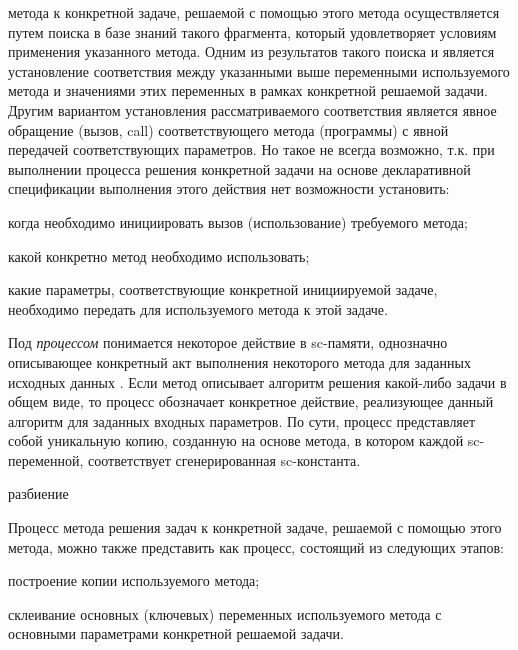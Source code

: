  метода к конкретной задаче, решаемой с помощью этого метода осуществляется путем поиска в базе знаний такого фрагмента, который удовлетворяет условиям применения указанного метода. Одним из результатов такого поиска и является установление соответствия между указанными выше переменными используемого метода и значениями этих переменных в рамках конкретной решаемой задачи. Другим вариантом установления рассматриваемого соответствия является явное обращение (вызов, call) соответствующего метода (программы) с явной передачей соответствующих параметров. Но такое не всегда возможно, т.к. при выполнении процесса решения конкретной задачи на основе декларативной спецификации выполнения этого действия нет возможности установить:
\begin{textitemize}
    \item когда необходимо инициировать вызов (использование) требуемого метода;
    \item какой конкретно метод необходимо использовать;
    \item какие параметры, соответствующие конкретной инициируемой задаче, необходимо передать для  используемого метода к этой задаче.
\end{textitemize}

Под \textit{процессом} понимается некоторое действие в sc-памяти, однозначно описывающее конкретный акт выполнения некоторого метода для заданных исходных данных \cite{Deikstra1978}. Если метод описывает алгоритм решения какой-либо задачи в общем виде, то процесс обозначает конкретное действие, реализующее данный алгоритм для заданных входных параметров. По сути, процесс представляет собой уникальную копию, созданную на основе метода, в котором каждой sc-переменной, соответствует сгенерированная sc-константа.

\begin{SCn}
\begin{scnrelfromset}{разбиение}
\end{scnrelfromset}
\end{SCn}

Процесс  метода решения задач к конкретной задаче, решаемой с помощью этого метода, можно также представить как процесс, состоящий из следующих этапов:
\begin{textitemize}
    \item построение копии используемого метода;
    \item склеивание основных (ключевых) переменных используемого метода с основными параметрами конкретной решаемой задачи.
\end{textitemize}


